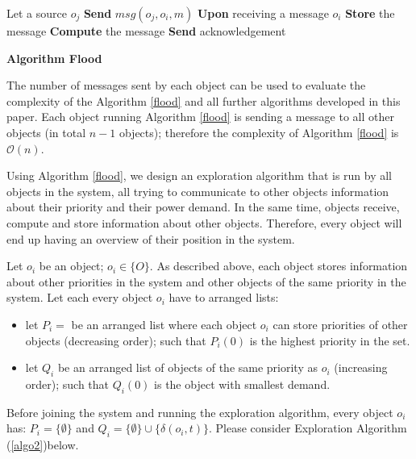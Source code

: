 \documentclass[../main/IoT.tex]{subfiles}
\begin{document}
\LinesNumbered
\IncMargin{1em}
\begin{algorithm}
Let a source $o_{j}$
\BlankLine
{} {
     {	
        \textbf{Send} \emph{$msg(o_{j},o_{i},m)$}
    }
}
 {
    \textbf{Upon} receiving a message $o_{i}$ \newline
       \textbf{Store} the message\newline
       \textbf{Compute} the message\newline
       \textbf{Send} acknowledgement
}
\caption{\textbf{Algorithm Flood}} \label{flood}
\end{algorithm}
\DecMargin{1em}

The number of messages sent by each object can be used to evaluate the complexity of the Algorithm \ref{flood} and all further algorithms developed in this paper. Each object running Algorithm \ref{flood} is sending a message to all other objects (in total $n-1$ objects); therefore the complexity of Algorithm \ref{flood} is $\mathcal{O}(n)$.

Using Algorithm \ref{flood}, we design an exploration algorithm that is run by all objects in the system, all trying to communicate to other objects information about their priority and their power demand. In the same time, objects receive, compute and store information about other objects. Therefore, every object will end up having an overview of their position in the system.

Let $o_{i}$ be an object; $o_{i} \in\{O\}$. As described above, each object stores information about other priorities in the system and other objects of the same priority in the system. Let each every object $o_{i}$ have to arranged lists:
\begin{itemize}
    \item let $P_{i}=$ be an arranged list where each object $o_{i}$ can store priorities of other objects (decreasing order); such that $P_{i}(0)$ is the highest priority in the set.
    \item let $Q_{i}$ be an arranged list of objects of the same priority as $o_{i}$ (increasing order); such that $Q_{i}(0)$ is the object with smallest demand.
\end{itemize}

Before joining the system and running the exploration algorithm, every object $o_{i}$ has: $P_{i}=\{\emptyset\}$ and $Q_{i}=\{\emptyset\}\cup\{\delta(o_{i},t)\}$. Please consider Exploration Algorithm (\ref{algo2})below.
\end{document}
